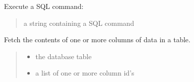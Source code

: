 \documentclass[letterpaper,12pt,english]{sphinxmanual}
\begin{document}
\begin{fulllineitems}
\begin{fulllineitems}
\begin{quote}
\begin{description}
\end{description}\end{quote}

\end{fulllineitems}


\begin{fulllineitems}
\label{\detokenize{api/networking:cbmpy.CBNetDB.DBTools.executeSQL}}
\pysigstartsignatures
\pysiglinewithargsret
{}
{}
{}
\pysigstopsignatures
\sphinxAtStartPar
Execute a SQL command:
\begin{quote}\begin{description}
\sphinxAtStartPar
{} \textendash{} a string containing a SQL command

\end{description}\end{quote}

\end{fulllineitems}


\begin{fulllineitems}
\label{\detokenize{api/networking:cbmpy.CBNetDB.DBTools.getColumns}}
\pysigstartsignatures
\pysiglinewithargsret
{}
{\sphinxparamcomma {}}
{}
\pysigstopsignatures
\sphinxAtStartPar
Fetch the contents of one or more columns of data in a table.
\begin{quote}\begin{description}
\begin{itemize}
\item {} 
\sphinxAtStartPar
{} \textendash{} the database table

\item {} 
\sphinxAtStartPar
{} \textendash{} a list of one or more column id’s

\end{itemize}

\end{description}\end{quote}


\end{fulllineitems}
\end{fulllineitems}
\end{document}
